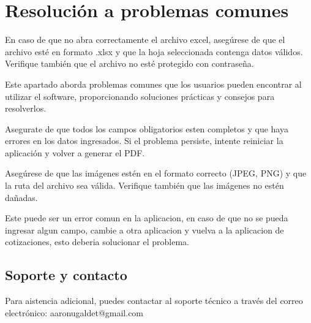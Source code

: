 \documentclass{Pretexto/bluereport}
\begin{document}
\section{Resolución a problemas comunes}
\begin{definicion}
    En caso de que no abra correctamente el archivo excel, asegúrese de que el archivo esté en formato .xlsx y que la hoja seleccionada contenga datos válidos. Verifique también que el archivo no esté protegido con contraseña.
\end{definicion}
\vspace{0.7cm}
\begin{definicion}
    Este apartado aborda problemas comunes que los usuarios pueden encontrar al utilizar el software, 
    proporcionando soluciones prácticas y consejos para resolverlos.
\end{definicion}
\vspace{0.7cm}
\begin{definicion}
    Asegurate de que todos los campos obligatorios esten completos y que haya errores en los datos ingresados. Si el problema persiste, intente reiniciar la aplicación y volver a generar el PDF.

\end{definicion}
\vspace{0.7cm}
\begin{definicion}
    
Asegúrese de que las imágenes estén en el formato correcto (JPEG, PNG) y que la ruta del archivo sea válida. Verifique también que las imágenes no estén dañadas.
\end{definicion}
\vspace{0.7cm}
\begin{definicion}
    Este puede ser un error comun en la aplicacion, en caso de que no se pueda ingresar algun campo, cambie a otra aplicacion y vuelva a la aplicacion de cotizaciones, esto deberia solucionar el problema.
\end{definicion}



\subsection{Soporte y contacto}

Para aistencia adicional, puedes contactar al soporte técnico a través del correo electrónico: aaronugaldet@gmail.com
\pagebreak
\end{document}

